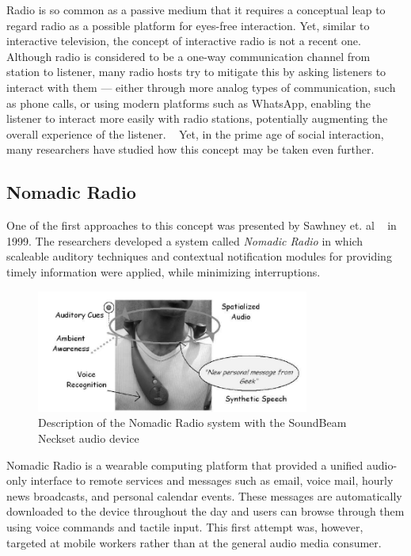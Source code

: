 Radio is so common as a passive medium that it requires a conceptual leap to regard radio as a possible platform for eyes-free interaction. Yet, similar to interactive television, the concept of interactive radio is not a recent one. Although radio is considered to be a one-way communication channel from station to listener, many radio hosts try to mitigate this by asking listeners to interact with them — either through more analog types of communication, such as phone calls, or using modern platforms such as WhatsApp, enabling the listener to interact more easily with radio stations, potentially augmenting the overall experience of the listener. ~\cite{Claes2018, Ren2004} Yet, in the prime age of social interaction, many researchers have studied how this concept may be taken even further.

\subsection{Nomadic Radio}

One of the first approaches to this concept was presented by Sawhney et. al ~\cite{Sawhney1999} in 1999. The researchers developed a system called \textit{Nomadic Radio} in which scaleable auditory techniques and contextual notification modules for providing timely information were applied, while minimizing interruptions.

\begin{figure}[h]
\centering
\includegraphics[width=0.8\textwidth]{./Images/nomadicradio.png}
\caption{Description of the Nomadic Radio system with the SoundBeam Neckset audio device}
\label{fig:test_env}
\end{figure}

Nomadic Radio is a wearable computing platform that provided a unified audio-only interface to remote services and messages such as email, voice mail, hourly news broadcasts, and personal calendar events. These messages are automatically downloaded to the device throughout the day and users can browse through them using voice commands and tactile input. This first attempt was, however, targeted at mobile workers rather than at the general audio media consumer.

